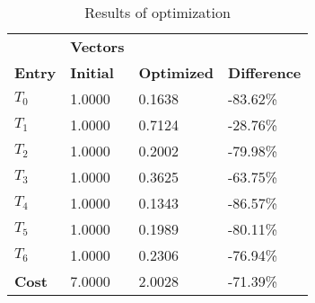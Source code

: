 \begin{table}[h!]
\centering
\begin{tabular}{llll}
\textbf{}      & \cellcolor[HTML]{EFEFEF}\textbf{Vectors} & \textbf{} & \textbf{}         \\
\rowcolor[HTML]{EFEFEF} 
\textbf{Entry} & \textbf{Initial} & \textbf{Optimized} & \textbf{Difference} \\
$T_0$ & 1.0000 & 0.1638 & -83.62\% \\ 
$T_1$ & 1.0000 & 0.7124 & -28.76\% \\ 
$T_2$ & 1.0000 & 0.2002 & -79.98\% \\ 
$T_3$ & 1.0000 & 0.3625 & -63.75\% \\ 
$T_4$ & 1.0000 & 0.1343 & -86.57\% \\ 
$T_5$ & 1.0000 & 0.1989 & -80.11\% \\ 
$T_6$ & 1.0000 & 0.2306 & -76.94\% \\ 
\rowcolor[HTML]{EFEFEF} 
\textbf{Cost}  & 7.0000 & 2.0028 & -71.39\% \\ 
\end{tabular}
\caption{Results of optimization}
\label{tab:OptimizationAnalysis}
\end{table}